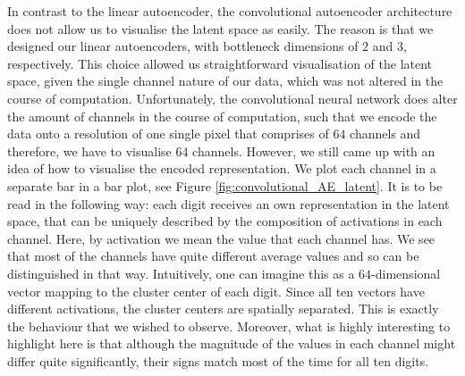 In contrast to the linear autoencoder, the convolutional autoencoder architecture does not allow us to visualise the latent space as easily. The reason is that we designed our linear autoencoders, with bottleneck dimensions of $2$ and $3$, respectively. This choice allowed us straightforward visualisation of the latent space, given the single channel nature of our data, which was not altered in the course of computation. Unfortunately, the convolutional neural network does alter the amount of channels in the course of computation, such that we encode the data onto a resolution of one single pixel that comprises of $64$ channels and therefore, we have to visualise $64$ channels. However, we still came up with an idea of how to visualise the encoded representation. We plot each channel in a separate bar in a bar plot, see Figure \ref{fig:convolutional_AE_latent}. It is to be read in the following way: each digit receives an own representation in the latent space, that can be uniquely described by the composition of activations in each channel. Here, by activation we mean the value that each channel has. We see that most of the channels have quite different average values and so can be distinguished in that way. Intuitively, one can imagine this as a $64$-dimensional vector mapping to the cluster center of each digit. Since all ten vectors have different activations, the cluster centers are spatially separated. This is exactly the behaviour that we wished to observe. Moreover, what is highly interesting to highlight here is that although the magnitude of the values in each channel might differ quite significantly, their signs match most of the time for all ten digits.


